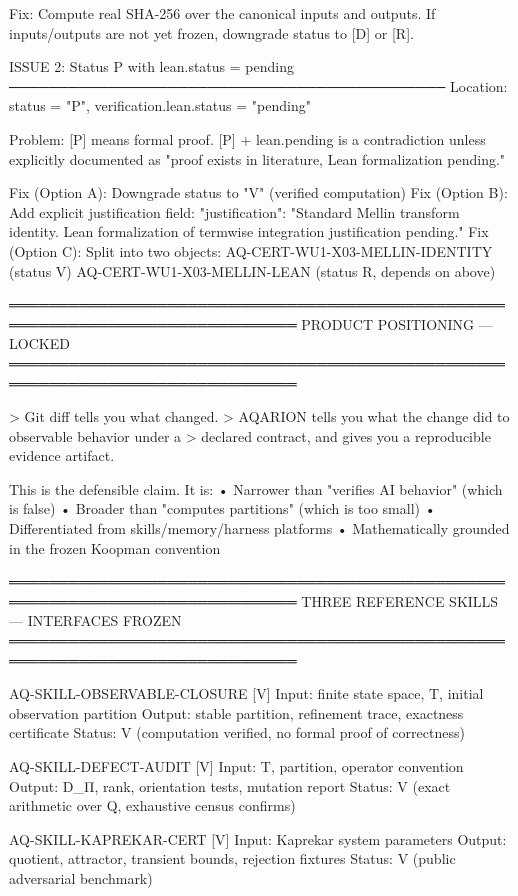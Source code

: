   Fix: Compute real SHA-256 over the canonical inputs and outputs.
       If inputs/outputs are not yet frozen, downgrade status to [D] or [R].

ISSUE 2: Status P with lean.status = pending
────────────────────────────────────────────
  Location: status = "P", verification.lean.status = "pending"
  
  Problem: [P] means formal proof. [P] + lean.pending is a contradiction
  unless explicitly documented as "proof exists in literature, Lean
  formalization pending."
  
  Fix (Option A): Downgrade status to "V" (verified computation)
  Fix (Option B): Add explicit justification field:
    "justification": "Standard Mellin transform identity. Lean formalization
                      of termwise integration justification pending."
  Fix (Option C): Split into two objects:
    AQ-CERT-WU1-X03-MELLIN-IDENTITY (status V)
    AQ-CERT-WU1-X03-MELLIN-LEAN (status R, depends on above)

═══════════════════════════════════════════════════════════════════════════════
PRODUCT POSITIONING — LOCKED
═══════════════════════════════════════════════════════════════════════════════

> Git diff tells you what changed.
> AQARION tells you what the change did to observable behavior under a
> declared contract, and gives you a reproducible evidence artifact.

This is the defensible claim. It is:
  • Narrower than "verifies AI behavior" (which is false)
  • Broader than "computes partitions" (which is too small)
  • Differentiated from skills/memory/harness platforms
  • Mathematically grounded in the frozen Koopman convention

═══════════════════════════════════════════════════════════════════════════════
THREE REFERENCE SKILLS — INTERFACES FROZEN
═══════════════════════════════════════════════════════════════════════════════

AQ-SKILL-OBSERVABLE-CLOSURE [V]
  Input:  finite state space, T, initial observation partition
  Output: stable partition, refinement trace, exactness certificate
  Status: V (computation verified, no formal proof of correctness)

AQ-SKILL-DEFECT-AUDIT [V]
  Input:  T, partition, operator convention
  Output: D_Π, rank, orientation tests, mutation report
  Status: V (exact arithmetic over Q, exhaustive census confirms)

AQ-SKILL-KAPREKAR-CERT [V]
  Input:  Kaprekar system parameters
  Output: quotient, attractor, transient bounds, rejection fixtures
  Status: V (public adversarial benchmark)

